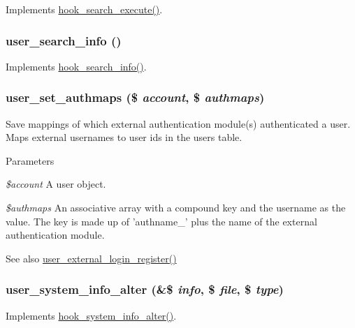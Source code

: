 \label{user_8module_a04e2120f38c081b16387b631602cc47f}
Implements \hyperlink{group__search_ga00be3e4a3b64ad73f8ad1304a450cee5}{hook\_\-search\_\-execute()}. \hypertarget{user_8module_afe2b64d026bd65a294788c4abe9b4861}{
\subsubsection[{user\_\-search\_\-info}]{\setlength{\rightskip}{0pt plus 5cm}user\_\-search\_\-info ()}}
\label{user_8module_afe2b64d026bd65a294788c4abe9b4861}
Implements \hyperlink{group__search_ga37b761616f2cad4796891008f2b374f3}{hook\_\-search\_\-info()}. \hypertarget{user_8module_a343e11a6324c7b4036be888e61412ceb}{
\subsubsection[{user\_\-set\_\-authmaps}]{\setlength{\rightskip}{0pt plus 5cm}user\_\-set\_\-authmaps (\$ {\em account}, \/  \$ {\em authmaps})}}
\label{user_8module_a343e11a6324c7b4036be888e61412ceb}
Save mappings of which external authentication module(s) authenticated a user. Maps external usernames to user ids in the users table.


\begin{DoxyParams}{Parameters}
\item[{\em \$account}]A user object. \item[{\em \$authmaps}]An associative array with a compound key and the username as the value. The key is made up of 'authname\_\-' plus the name of the external authentication module. \end{DoxyParams}
\begin{DoxySeeAlso}{See also}
\hyperlink{user_8module_af4a2f1223554e9d79172c92273b81f2b}{user\_\-external\_\-login\_\-register()} 
\end{DoxySeeAlso}
\hypertarget{user_8module_a4fc928f2162969ae4331773ff226e3ec}{
\subsubsection[{user\_\-system\_\-info\_\-alter}]{\setlength{\rightskip}{0pt plus 5cm}user\_\-system\_\-info\_\-alter (\&\$ {\em info}, \/  \$ {\em file}, \/  \$ {\em type})}}
\label{user_8module_a4fc928f2162969ae4331773ff226e3ec}
Implements \hyperlink{group__hooks_ga7dd7f887131916d5bbbb02ae87a9113e}{hook\_\-system\_\-info\_\-alter()}.

